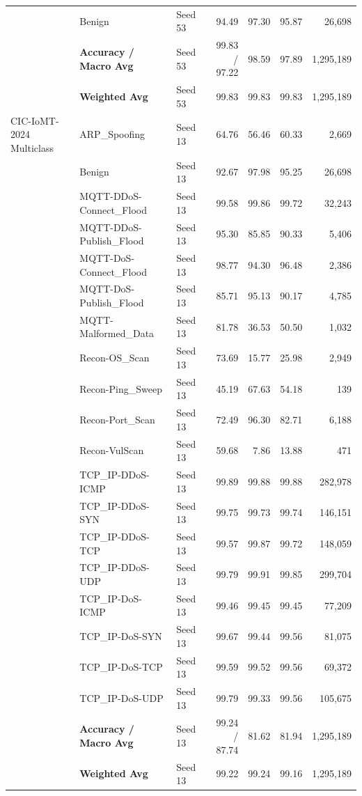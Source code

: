\documentclass[a4paper,fleqn]{cas-sc}
\begin{document}
{\begin{landscape}
\begin{longtable}{lllrrrr}
 & Benign & Seed 53 & 94.49 & 97.30 & 95.87 & 26,698 \\
 & \textbf{Accuracy / Macro Avg} & Seed 53 & 99.83 / 97.22 & 98.59 & 97.89 & 1,295,189 \\
 & \textbf{Weighted Avg} & Seed 53 & 99.83 & 99.83 & 99.83 & 1,295,189 \\
\midrule
CIC-IoMT-2024 Multiclass & ARP\_Spoofing & Seed 13 & 64.76 & 56.46 & 60.33 & 2,669 \\
 & Benign & Seed 13 & 92.67 & 97.98 & 95.25 & 26,698 \\
 & MQTT-DDoS-Connect\_Flood & Seed 13 & 99.58 & 99.86 & 99.72 & 32,243 \\
 & MQTT-DDoS-Publish\_Flood & Seed 13 & 95.30 & 85.85 & 90.33 & 5,406 \\
 & MQTT-DoS-Connect\_Flood & Seed 13 & 98.77 & 94.30 & 96.48 & 2,386 \\
 & MQTT-DoS-Publish\_Flood & Seed 13 & 85.71 & 95.13 & 90.17 & 4,785 \\
 & MQTT-Malformed\_Data & Seed 13 & 81.78 & 36.53 & 50.50 & 1,032 \\
 & Recon-OS\_Scan & Seed 13 & 73.69 & 15.77 & 25.98 & 2,949 \\
 & Recon-Ping\_Sweep & Seed 13 & 45.19 & 67.63 & 54.18 & 139 \\
 & Recon-Port\_Scan & Seed 13 & 72.49 & 96.30 & 82.71 & 6,188 \\
 & Recon-VulScan & Seed 13 & 59.68 & 7.86 & 13.88 & 471 \\
 & TCP\_IP-DDoS-ICMP & Seed 13 & 99.89 & 99.88 & 99.88 & 282,978 \\
 & TCP\_IP-DDoS-SYN & Seed 13 & 99.75 & 99.73 & 99.74 & 146,151 \\
 & TCP\_IP-DDoS-TCP & Seed 13 & 99.57 & 99.87 & 99.72 & 148,059 \\
 & TCP\_IP-DDoS-UDP & Seed 13 & 99.79 & 99.91 & 99.85 & 299,704 \\
 & TCP\_IP-DoS-ICMP & Seed 13 & 99.46 & 99.45 & 99.45 & 77,209 \\
 & TCP\_IP-DoS-SYN & Seed 13 & 99.67 & 99.44 & 99.56 & 81,075 \\
 & TCP\_IP-DoS-TCP & Seed 13 & 99.59 & 99.52 & 99.56 & 69,372 \\
 & TCP\_IP-DoS-UDP & Seed 13 & 99.79 & 99.33 & 99.56 & 105,675 \\
 & \textbf{Accuracy / Macro Avg} & Seed 13 & 99.24 / 87.74 & 81.62 & 81.94 & 1,295,189 \\
 & \textbf{Weighted Avg} & Seed 13 & 99.22 & 99.24 & 99.16 & 1,295,189 \\

\end{longtable}
\end{landscape}}
\end{document}
